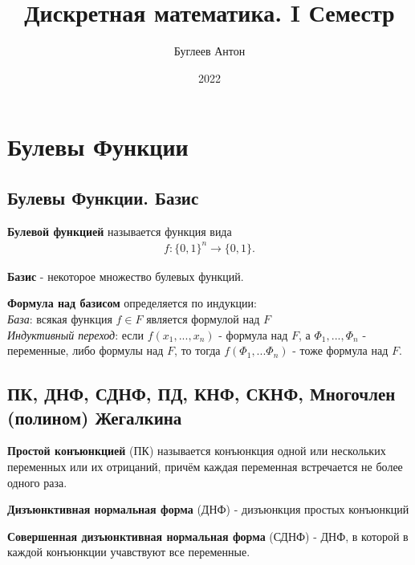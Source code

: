 \documentclass[a4paper, 14pt]{article}
\title{Дискретная математика. I Семестр}
\author{Буглеев Антон}
\date{2022}
\begin{document}
    
    \maketitle
    \newpage

    \section{Булевы Функции}
    
    \subsection{Булевы Функции. Базис}
    \begin{definition}
        {\bf Булевой функцией} называется функция вида
        \begin{align*}
            f : \{0, 1\}^n \rightarrow \{0, 1\}.
        \end{align*}
    \end{definition}

    \begin{definition}
        {\bf Базис} - некоторое множество булевых функций.
    \end{definition}
    
    \begin{definition}
        {\bf Формула над базисом} определяется по индукции: \\
        {\it База}: всякая функция $f \in F$ является формулой над $F$ \\
        {\it Индуктивный переход}: если $f(x_1, ..., x_n)$ - формула над $F$,
        а $\Phi_1, ..., \Phi_n$ - переменные, либо формулы над $F$, то тогда
        $f(\Phi_1, ... \Phi_n)$ - тоже формула над $F$.
    \end{definition}


    \subsection{ПК, ДНФ, СДНФ, ПД, КНФ, СКНФ, Многочлен (полином) Жегалкина}
    \begin{definition}
        {\bf Простой конъюнкцией} (ПК) называется конъюнкция одной или нескольких переменных
        или их отрицаний, причём каждая переменная встречается не более одного раза.
    \end{definition}
    \begin{definition}
        {\bf Дизъюнктивная нормальная форма} (ДНФ) - дизъюнкция простых конъюнкций
    \end{definition}
    \begin{definition}
        {\bf Совершенная дизъюнктивная нормальная форма} (СДНФ) - ДНФ, в которой в
        каждой конъюнкции учавствуют все переменные. 
    \end{definition}
\end{document}
